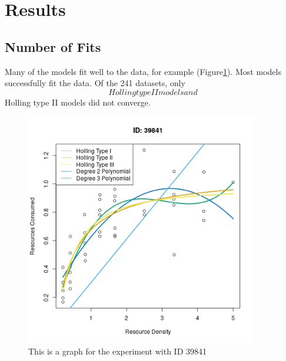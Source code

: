 \documentclass{article}
\begin{document}
\section{Results}
\subsection{Number of Fits}
Many of the models fit well to the data, for example (Figure\ref{fig:2}). Most models successfully fit the data. Of the 241 datasets, only $$ Holling type II models and $$ Holling type II models did not converge. 
\begin{figure}[h!] 
    \centering
    \includegraphics[width=4in]{../Results/Plots/39841.png}
    \caption{This is a graph for the experiment with ID 39841}
    \label{fig:2}
\end{figure}
\end{document}
